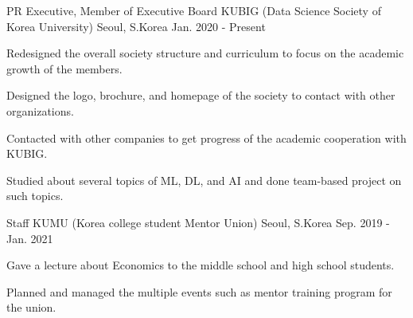 

\begin{cventries}

  \cventry
    {PR Executive, Member of Executive Board} %
    {KUBIG (Data Science Society of Korea University)} %
    {Seoul, S.Korea} %
    {Jan. 2020 - Present} %
    {
      \begin{cvitems} %
        \item {Redesigned the overall society structure and curriculum to focus on the academic growth of the members.}
        \item {Designed the logo, brochure, and homepage of the society to contact with other organizations.}
        \item {Contacted with other companies to get progress of the academic cooperation with KUBIG.}
        \item {Studied about several topics of ML, DL, and AI and done team-based project on such topics.}
      \end{cvitems}
    }

  \cventry
    {Staff} %
    {KUMU (Korea college student Mentor Union)} %
    {Seoul, S.Korea} %
    {Sep. 2019 - Jan. 2021} %
    {
      \begin{cvitems} %
        \item {Gave a lecture about Economics to the middle school and high school students.}
        \item {Planned and managed the multiple events such as mentor training program for the union.}
      \end{cvitems}
    }

\end{cventries}
